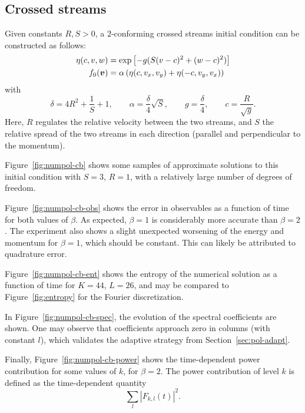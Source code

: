 \subsection{Crossed streams} \label{sec:numpol-cb}

Given constants $R,S>0$, a $2$-conforming crossed streams initial condition can be constructed as follows:
\begin{align*}
    \eta(c,v,w) &= \exp\left[-g(S(v-c)^2 + (w-c)^2)\right] \\
    f_0({\bm v}) &= \alpha\left( \eta(c,v_x,v_y) + \eta(-c,v_y,v_x) \right)
\end{align*}
with
\[
    \delta = 4R^2+\frac{1}{S}+1, \qquad
    \alpha = \frac{\delta}{4}\sqrt{S}, \qquad
    g = \frac{\delta}{4}, \qquad
    c = \frac{R}{\sqrt{g}}.
\]
Here, $R$ regulates the relative velocity between the two streams, and $S$ the relative spread of the two
streams in each direction (parallel and perpendicular to the momentum).

Figure~\vref{fig:numpol-cb} shows some samples of approximate solutions to this initial condition with $S=3$,
$R=1$, with a relatively large number of degrees of freedom.

Figure~\vref{fig:numpol-cb-obs} shows the error in observables as a function of time for both values of
$\beta$. As expected, $\beta=1$ is considerably more accurate than $\beta=2$. The experiment also shows a
slight unexpected worsening of the energy and momentum for $\beta=1$, which should be constant. This can
likely be attributed to quadrature error.

Figure~\vref{fig:numpol-cb-ent} shows the entropy of the numerical solution as a function of time for $K=44$,
$L=26$, and may be compared to Figure~\ref{fig:entropy} for the Fourier discretization.

In Figure~\vref{fig:numpol-cb-spec}, the evolution of the spectral coefficients are shown. One may observe
that coefficients approach zero in columns (with constant $l$), which validates the adaptive strategy from
Section~\ref{sec:pol-adapt}.

Finally, Figure~\vref{fig:numpol-cb-power} shows the time-dependent power contribution for some values of $k$,
for $\beta=2$. The power contribution of level $k$ is defined as the time-dependent quantity
\[
    \sum_l |F_{k,l}(t)|^2.
\]

